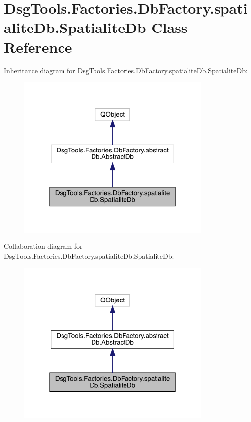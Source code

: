\hypertarget{class_dsg_tools_1_1_factories_1_1_db_factory_1_1spatialite_db_1_1_spatialite_db}{}\section{Dsg\+Tools.\+Factories.\+Db\+Factory.\+spatialite\+Db.\+Spatialite\+Db Class Reference}
\label{class_dsg_tools_1_1_factories_1_1_db_factory_1_1spatialite_db_1_1_spatialite_db}


Inheritance diagram for Dsg\+Tools.\+Factories.\+Db\+Factory.\+spatialite\+Db.\+Spatialite\+Db\+:
\nopagebreak
\begin{figure}[H]
\begin{center}
\leavevmode
\includegraphics[width=271pt]{class_dsg_tools_1_1_factories_1_1_db_factory_1_1spatialite_db_1_1_spatialite_db__inherit__graph}
\end{center}
\end{figure}


Collaboration diagram for Dsg\+Tools.\+Factories.\+Db\+Factory.\+spatialite\+Db.\+Spatialite\+Db\+:
\nopagebreak
\begin{figure}[H]
\begin{center}
\leavevmode
\includegraphics[width=271pt]{class_dsg_tools_1_1_factories_1_1_db_factory_1_1spatialite_db_1_1_spatialite_db__coll__graph}
\end{center}
\end{figure}
